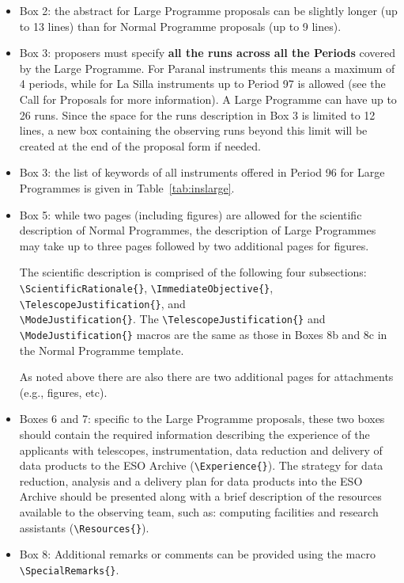 \documentclass{article}
\begin{document}
\begin{itemize}
\item Box 2: the abstract for Large Programme proposals can be
  slightly longer (up to 13 lines) than for Normal Programme proposals
  (up to 9 lines).  
\item Box 3: proposers must specify {\bf all the runs across all the
    Periods} covered by the Large Programme.
For Paranal instruments this means a maximum of 4 periods, while for La Silla instruments
up to Period 97 is allowed (see the Call for Proposals for more information). 
  A Large Programme can have up to 26 runs. Since the space for the runs
  description in Box 3 is limited to 12 lines, a new box containing
  the observing runs beyond this limit will be created at the end of
  the proposal form if needed.
\item Box 3: the list of keywords of all instruments offered in Period
  96 for Large Programmes is given in
  Table~\ref{tab:inslarge}.
\item Box 5: while two pages (including figures) are allowed for the scientific
  description of Normal Programmes, the
  description of Large Programmes may take up to three pages followed by
  two additional pages for figures.

  The scientific description is comprised of the following four subsections:
  \verb|\ScientificRationale{}|,
  \verb|\ImmediateObjective{}|, \verb|\TelescopeJustification{}|, and\\
  \verb|\ModeJustification{}|.  
  The \verb|\TelescopeJustification{}| and \verb|\ModeJustification{}|
  macros are the same as those in Boxes 8b and 8c in the Normal Programme
  template.
  
  As noted above there are also there are two additional pages for
  attachments (e.g., figures, etc). 
\item Boxes 6 and 7: specific to the Large Programme proposals, these
  two boxes should contain the required information describing the
  experience of the applicants with telescopes, instrumentation, 
  data reduction  and delivery of data products to the ESO Archive 
  (\verb|\Experience{}|). The strategy for data reduction, analysis 
  and a delivery plan for data products into the ESO Archive should 
  be presented along with a brief description of the resources available
  to the observing team, such as: computing facilities and research
  assistants (\verb|\Resources{}|).
\item Box 8: Additional remarks or comments can be provided using
  the macro \verb|\SpecialRemarks{}|.
\end{itemize} 
\end{document}
